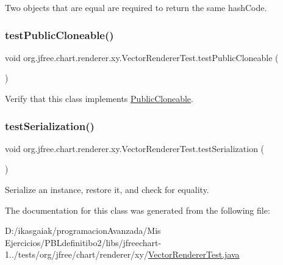 Two objects that are equal are required to return the same hash\+Code. \mbox{\label{classorg_1_1jfree_1_1chart_1_1renderer_1_1xy_1_1_vector_renderer_test_ae75d47a1b50e173f2213a7c855450822}} 
\subsubsection{\texorpdfstring{test\+Public\+Cloneable()}{testPublicCloneable()}}
{\footnotesize\ttfamily void org.\+jfree.\+chart.\+renderer.\+xy.\+Vector\+Renderer\+Test.\+test\+Public\+Cloneable (\begin{DoxyParamCaption}{ }\end{DoxyParamCaption})}

Verify that this class implements \mbox{\hyperlink{}{Public\+Cloneable}}. \mbox{\label{classorg_1_1jfree_1_1chart_1_1renderer_1_1xy_1_1_vector_renderer_test_aac163180045503a538f6019ac36ec0fd}} 
\subsubsection{\texorpdfstring{test\+Serialization()}{testSerialization()}}
{\footnotesize\ttfamily void org.\+jfree.\+chart.\+renderer.\+xy.\+Vector\+Renderer\+Test.\+test\+Serialization (\begin{DoxyParamCaption}{ }\end{DoxyParamCaption})}

Serialize an instance, restore it, and check for equality. 

The documentation for this class was generated from the following file\+:\begin{DoxyCompactItemize}
\item 
D\+:/ikasgaiak/programacion\+Avanzada/\+Mis Ejercicios/\+P\+B\+Ldefinitibo2/libs/jfreechart-\/1../tests/org/jfree/chart/renderer/xy/\mbox{\hyperlink{_vector_renderer_test_8java}{Vector\+Renderer\+Test.\+java}}\end{DoxyCompactItemize}
